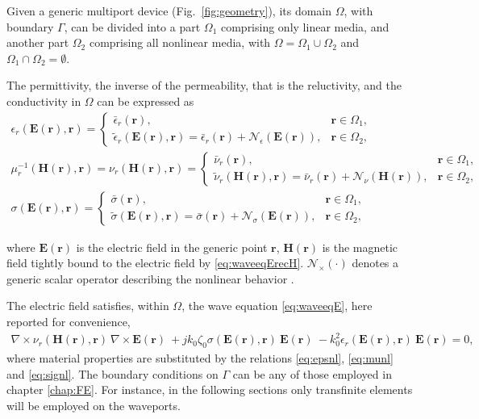 Given a generic multiport device (Fig.~\ref{fig:geometry}), its
domain $\Omega$, with boundary $\Gamma$, can be divided into a part $\Omega_1$ comprising only linear media, and another part $\Omega_2$ comprising all nonlinear media, with $\Omega = \Omega_1 \cup \Omega_2$ and
$\Omega_1 \cap \Omega_2 = \emptyset$.

The permittivity, the inverse of the permeability, that is the reluctivity, and the conductivity in $\Omega$ can be expressed as 
%
\begin{gather}
\epsilon_r(\mathbf{E}(\mathbf{r}),\mathbf{r}) = 
\begin{cases}
\bar{\epsilon}_r(\mathbf{r}), & \mathbf{r} \in \Omega_1,  \\
\tilde{\epsilon}_r(\mathbf{E}(\mathbf{r}), \mathbf{r}) \!=\!
\bar{\epsilon}_r(\mathbf{r}) \!+\! \mathcal{N}_\epsilon(\mathbf{E}(\mathbf{r})), & \mathbf{r} \in
\Omega_2,
\end{cases} \label{eq:epsnl}\\
\mu_r^{-1}(\mathbf{H}(\mathbf{r}),\mathbf{r}) = \nu_r(\mathbf{H}(\mathbf{r}),\mathbf{r}) = 
\begin{cases}
\bar{\nu}_r(\mathbf{r}), & \mathbf{r} \in \Omega_1, \\
\tilde{\nu}_r(\mathbf{H}(\mathbf{r}), \mathbf{r}) \!=\!
\bar{\nu}_r(\mathbf{r}) \!+\! \mathcal{N}_\nu(\mathbf{H}(\mathbf{r})), & \mathbf{r} \in
\Omega_2,
\end{cases}\label{eq:munl}\\
\sigma(\mathbf{E}(\mathbf{r}),\mathbf{r}) = 
\begin{cases}
\bar{\sigma}(\mathbf{r}), & \mathbf{r} \in \Omega_1, \\
\tilde{\sigma}(\mathbf{E}(\mathbf{r}), \mathbf{r}) \!=\!
\bar{\sigma}(\mathbf{r}) \!+\! \mathcal{N}_\sigma(\mathbf{E}(\mathbf{r})), & \mathbf{r} \in
\Omega_2,
\end{cases}\label{eq:signl}
\end{gather}

\noindent where $\mathbf{E}(\mathbf{r})$ is the electric field in the generic point
$\mathbf{r}$, $\mathbf{H}(\mathbf{r})$ is the magnetic field tightly bound to the electric field by \eqref{eq:waveeqErecH}. $\mathcal{N}_\times(\cdot)$ denotes a generic scalar operator describing the nonlinear behavior \cite{Guarnieri2010}. 

The electric field satisfies, within $\Omega$, the wave equation \eqref{eq:waveeqE}, here reported for convenience,
\begin{multline}
\nabla \times \nu_r(\mathbf{H}(\mathbf{r}),\mathbf{r}) \ \nabla \times {\mathbf{E}(\mathbf{r})} \ + j k_0 \zeta_0 \sigma(\mathbf{E}(\mathbf{r}),\mathbf{r}) \ {\mathbf{E}(\mathbf{r})} \ - k_0^2 \epsilon_r(\mathbf{E}(\mathbf{r}),\mathbf{r}) \ {\mathbf{E}(\mathbf{r})} = 0,\label{eq:waveeqEnl}
\end{multline}
\noindent where material properties are substituted by the relations \eqref{eq:epsnl}, \eqref{eq:munl} and \eqref{eq:signl}. The boundary conditions on $\Gamma$ can be any of those employed in chapter \ref{chap:FE}. For instance, in the following sections only transfinite elements will be employed on the waveports.

